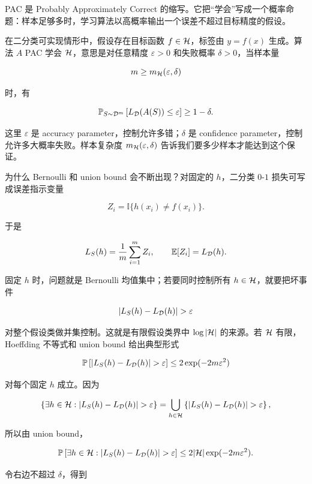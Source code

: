 \documentclass[11pt]{ctexart}
\begin{document}

PAC 是 Probably Approximately Correct 的缩写。它把“学会”写成一个概率命题：样本足够多时，学习算法以高概率输出一个误差不超过目标精度的假设。

\begin{definition}
在二分类可实现情形中，假设存在目标函数 \(f\in\mathcal{H}\)，标签由 \(y=f(x)\) 生成。算法 \(A\) PAC 学会 \(\mathcal{H}\)，意思是对任意精度 \(\varepsilon>0\) 和失败概率 \(\delta>0\)，当样本量

\[
  m\ge m_{\mathcal{H}}(\varepsilon,\delta)
\]

时，有

\[
  \mathbb{P}_{S\sim \mathcal{D}^m}
  \left[
    L_{\mathcal{D}}(A(S))\le \varepsilon
  \right]
  \ge 1-\delta.
\]
\end{definition}

这里 \(\varepsilon\) 是 accuracy parameter，控制允许多错；\(\delta\) 是 confidence parameter，控制允许多大概率失败。样本复杂度 \(m_{\mathcal{H}}(\varepsilon,\delta)\) 告诉我们要多少样本才能达到这个保证。

为什么 Bernoulli 和 union bound 会不断出现？对固定的 \(h\)，二分类 \(0\)-\(1\) 损失可写成误差指示变量

\[
  Z_i=\mathbb{I}\{h(x_i)\ne f(x_i)\}.
\]

于是

\[
  L_S(h)=\frac1m\sum_{i=1}^{m}Z_i,
  \qquad
  \mathbb{E}[Z_i]=L_{\mathcal{D}}(h).
\]

固定 \(h\) 时，问题就是 Bernoulli 均值集中；若要同时控制所有 \(h\in\mathcal{H}\)，就要把坏事件

\[
  \left|L_S(h)-L_{\Dcal}(h)\right|>\varepsilon
\]

对整个假设类做并集控制。这就是有限假设类界中 \(\log|\mathcal{H}|\) 的来源。若 \(\mathcal{H}\) 有限，Hoeffding 不等式和 union bound 给出典型形式

\[
  \Pbb\left[
    |L_S(h)-L_{\Dcal}(h)|>\varepsilon
  \right]
  \le
  2\exp(-2m\varepsilon^2)
\]

对每个固定 \(h\) 成立。因为

\[
  \left\{
    \exists h\in\Hcal:
    |L_S(h)-L_{\Dcal}(h)|>\varepsilon
  \right\}
  =
  \bigcup_{h\in\Hcal}
  \left\{
    |L_S(h)-L_{\Dcal}(h)|>\varepsilon
  \right\},
\]

所以由 union bound，

\[
  \Pbb\left[
    \exists h\in\Hcal:
    |L_S(h)-L_{\Dcal}(h)|>\varepsilon
  \right]
  \le
  2|\Hcal|\exp(-2m\varepsilon^2).
\]

令右边不超过 \(\delta\)，得到
\end{document}
